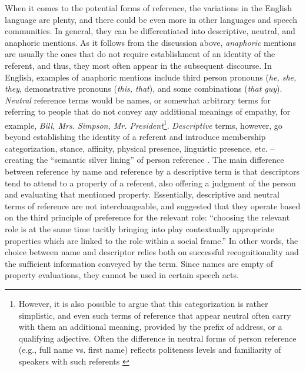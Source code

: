 \documentclass[12pt]{article}
\begin{document}
When it comes to the potential forms of reference, the variations in the English language are plenty, and there could be even more in other languages and speech communities. In general, they can be differentiated into descriptive, neutral, and anaphoric mentions. As it follows from the discussion above, \textit{anaphoric} mentions are usually the ones that do not require establishment of an identity of the referent, and thus, they most often appear in the subsequent discourse. In English, examples of anaphoric mentions include third person pronouns (\textit{he, she, they}, demonstrative pronouns (\textit{this, that}), and some combinations (\textit{that guy}). \textit{Neutral} reference terms would be names, or somewhat arbitrary terms for referring to people that do not convey any additional meanings of empathy, for example, \textit{Bill, Mrs. Simpson, Mr. President}\footnote{However, it is also possible to argue that this categorization is rather simplistic, and even such terms of reference that appear neutral often carry with them an additional meaning, provided by the prefix of address, or a qualifying adjective. Often the difference in neutral forms of person reference (e.g., full name vs. first name) reflects politeness levels and familiarity of speakers with such referents \parencite{downing1996}}. \textit{Descriptive} terms, however, go beyond establishing the identity of a referent and introduce membership categorization, stance, affinity, physical presence, linguistic presence, etc. -- creating the ``semantic silver lining'' of person reference \parencite[p.132]{defornel1987}. The main difference between reference by name and reference by a descriptive term is that descriptors tend to attend to a property of a referent, also offering a judgment of the person and evaluating that mentioned property. Essentially, descriptive and neutral terms of reference are not interchangeable, and \textcite[p.136]{defornel1987} suggested that they operate based on the third principle of preference for the relevant role: ``choosing the relevant role is at the same time tacitly bringing into play contextually appropriate properties which are linked to the role within a social frame.'' In other words, the choice between name and descriptor relies both on successful recognitionality and the sufficient information conveyed by the term. Since names are empty of property evaluations, they cannot be used in certain speech acts.
\end{document}
